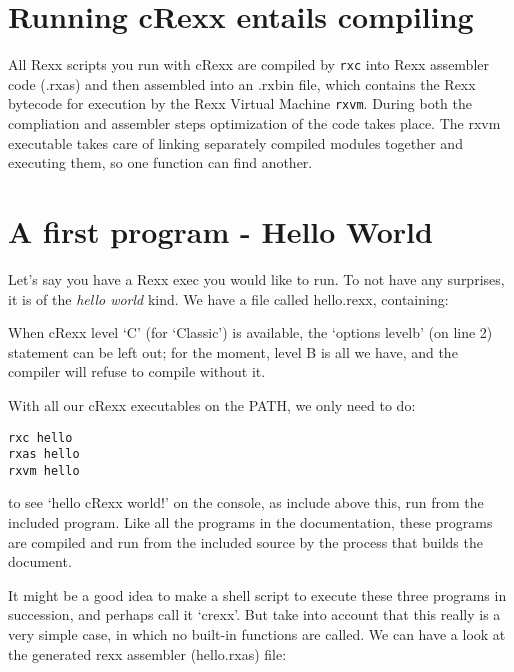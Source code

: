 \hypertarget{running-crexx-entails-compiling}{%
\section{Running cRexx entails
compiling}\label{running-crexx-entails-compiling}}

All Rexx scripts you run with cRexx are compiled by \texttt{rxc} into
Rexx assembler code (.rxas) and then assembled into an .rxbin file,
which contains the Rexx bytecode for execution by the Rexx Virtual
Machine \texttt{rxvm}. During both the compliation and assembler steps
optimization of the code takes place. The rxvm executable takes care of
linking separately compiled modules together and executing them, so one
function can find another.

\hypertarget{a-first-program---hello-world}{%
\section{A first program - Hello
World}\label{a-first-program---hello-world}}

Let's say you have a Rexx exec you would like to run. To not have any
surprises, it is of the \emph{hello world} kind. We have a file called
hello.rexx, containing:


\begin{shaded}
  \small
\obeylines {}
\end{shaded}

When cRexx level `C' (for `Classic') is available, the `options levelb'
(on line 2) statement can be left out; for the moment, level B is all we
have, and the compiler will refuse to compile without it.

With all our cRexx executables on the PATH, we only need to do:

\begin{verbatim}
rxc hello
rxas hello
rxvm hello
\end{verbatim}

to see `hello cRexx world!' on the console, as include above this, run
from the included program. Like all the programs in the \crexx{}
documentation, these programs are compiled and run from the included
source by the process that builds the document.

It might be a good idea to make a shell script to execute these three
programs in succession, and perhaps call it `crexx'. But take into
account that this really is a very simple case, in which no built-in
functions are called. We can have a look at the generated rexx assembler
(hello.rxas) file:

